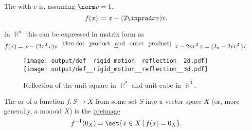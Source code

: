 \begin{definition}
\begin{thmenum}
     The  with  \( v \) is, assuming \( \norm v = 1 \),
    \begin{equation*}
      f(x) \coloneqq x - (2 \inprod x v) v.
    \end{equation*}

    In \( \BbbR^n \) this can be expressed in matrix form as
    \begin{equation*}
      f(x)
      =
      x - (2 x^T v) v
      \reloset {\ref{thm:dot_product_and_outer_product}} =
      x - 2 v v^T x
      =
      (I_n - 2 v v^T) x.
    \end{equation*}

    \begin{figure}[!ht]
      \hfill
      \texttt{[image: output/def\_\_rigid\_motion\_\_reflection\_\_2d.pdf]}
      \hfill
      \texttt{[image: output/def\_\_rigid\_motion\_\_reflection\_\_3d.pdf]}
      \hfill
      \hfill
      \caption{Reflection of the unit square in \( \BbbR^2 \) and unit cube in \( \BbbR^3 \).}\label{fig:def/rigid_motion/reflection}
    \end{figure}
  \end{thmenum}
\end{definition}

\begin{definition}\label{def:zero_locus}\mimprovised
  The  or  of a function \( f: S \to X \) from some set \( S \) into a vector space \( X \) (or, more generally, a monoid \( X \)) is the \hyperref[thm:def:function/preimage]{preimage}
  \begin{equation*}
    f^{-1}(0_X) = \set{ x \in X \given f(x) = 0_X }.
  \end{equation*}
\end{definition}

